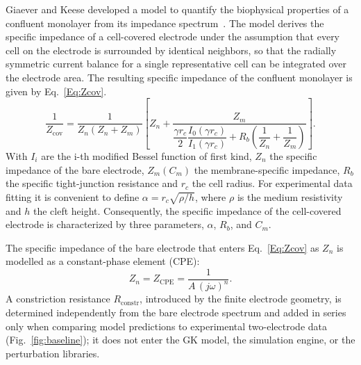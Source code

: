 \documentclass[english, 10pt, a4paper]{article}
\begin{document}
Giaever and Keese developed a model to quantify the biophysical properties of a confluent monolayer from its impedance spectrum~\cite{giaever1991micromotion,giaever1984monitoring}. The model derives the specific impedance of a cell-covered electrode under the assumption that every cell on the electrode is surrounded by identical neighbors, so that the radially symmetric current balance for a single representative cell can be integrated over the electrode area. The resulting specific impedance of the confluent monolayer is given by Eq.~\ref{Eq:Zcov}.
\begin{equation} \label{Eq:Zcov}
 \frac{1}{Z_\text{cov}} = \frac{1}{Z_n(Z_n+Z_m)}
 \left[Z_n + \frac{Z_m}{\dfrac{\gamma r_c}{2}
 \dfrac{I_0(\gamma r_c)}{I_1(\gamma r_c)}
 + R_b\!\left(\dfrac{1}{Z_n}+\dfrac{1}{Z_m}\right)}\right].
\end{equation}
With $I_i$ are the i-th modified Bessel function of first kind, $Z_n$ the specific impedance of the bare electrode, $Z_m(C_m)$ the membrane-specific impedance, $R_b$ the specific tight-junction resistance and $r_c$ the cell radius. For experimental data fitting it is convenient to define $\alpha = r_c\sqrt{\rho/h}$, where $\rho$ is the medium resistivity and $h$ the cleft height. Consequently, the specific impedance of the cell-covered electrode is characterized by three parameters, $\alpha$, $R_b$, and $C_m$.

The specific impedance of the bare electrode that enters Eq.~\ref{Eq:Zcov} as $Z_n$ is modelled as a constant-phase element (CPE):
\begin{equation}
 Z_n = Z_\text{CPE} = \frac{1}{A\,(j\omega)^n}. \label{Eq:CPE}
\end{equation}
A constriction resistance $R_\text{constr}$, introduced by the finite electrode geometry, is determined independently from the bare electrode spectrum and added in series only when comparing model predictions to experimental two-electrode data (Fig.~\ref{fig:baseline}); it does not enter the GK model, the simulation engine, or the perturbation libraries.
\end{document}

